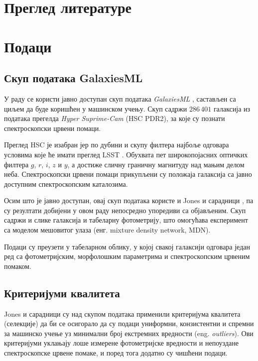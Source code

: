 \documentclass[12pt,oneside]{memoir}
\begin{document}
\chapter{Преглед литературе}

\chapter{Подаци}
\label{ch:data}

\section{Скуп података GalaxiesML}

У раду се користи јавно доступан скуп података \emph{GalaxiesML}
\cite{do2024}, састављен са циљем да буде коришћен у машинском учењу.
Скуп садржи $286\,401$ галаксија из података прегелда \emph{Hyper Suprime-Cam} (HSC PDR2),
за које су познати спектроскопски црвени помаци.

Преглед HSC је изабран јер по дубини и скупу филтера најбоље одговара
условима које ће имати преглед LSST \cite{rubin2026lsst}. Обухвата пет 
широкопојасних оптичких филтера $g$, $r$, $i$, $z$ и $y$, а достиже сличну граничну
магнитуду над мањим делом неба. Спектроскопски црвени помаци прикупљени су
положаја галаксија са јавно доступним спектроскопским каталозима.

Осим што је јавно доступан, овај скуп података користе и Jones и сарадници
\cite{jones2024a, jones2024b}, па су резултати добијени у овом раду непосредно упоредиви
са објављеним. Скуп садржи и слике галаксија и табеларну фотометрију, што омогућава
експеримент са моделом мешовитог улаза (енг. mixture density network, MDN).

Подаци су преузети у табеларном облику, у којој свакој галаксији одговара
један ред са фотометријским, морфолошким параметрима и спектроскопским црвеним помаком.

\section{Критеријуми квалитета}

Jones и сарадници \cite{jones2024a, jones2024b} су над скупом података
применили критеријума квалитета (селекције) да би се осигорало да су 
подаци униформни, конзистентни и спремни за машинско учење уз минимални број
екстремних вредности (eng. \textit{outliers}). Ови критеријуми уклањају лоше измерене
фотометријске вредности и непоуздане спектроскопске црвене помаке, и поред тога додатно
су чишћени подаци. 
\end{document}
